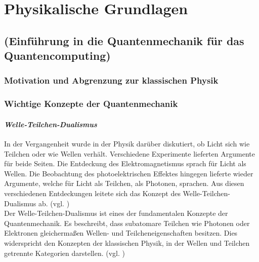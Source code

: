 \chapter{Physikalische Grundlagen}
\label{physics} %



\section{(Einführung in die Quantenmechanik für das Quantencomputing)}
\subsection{Motivation und Abgrenzung zur klassischen Physik }
\subsection{Wichtige Konzepte der Quantenmechanik }
\label{Wichtige Konzepte der Quantenmechanik}

\subsubsection*{\textit{Welle-Teilchen-Dualismus}}
\label{Welle-Teilchen-Dualismus}

In der Vergangenheit wurde in der Physik darüber diskutiert, ob Licht sich wie Teilchen oder wie Wellen verhält. Verschiedene Experimente lieferten Argumente für beide Seiten. Die Entdeckung des Elektromagnetismus sprach für Licht als Wellen. Die Beobachtung des photoelektrischen Effektes hingegen lieferte wieder Argumente, welche für Licht als Teilchen, als Photonen, sprachen. Aus diesen verschiedenen Entdeckungen leitete sich das Konzept des Welle-Teilchen-Dualismus ab. (vgl. \cite[Ch. 1.3.2]{kasirajan_fundamentals_2021})\\

Der Welle-Teilchen-Dualismus ist eines der fundamentalen Konzepte der Quantenmechanik. Es beschreibt, dass subatomare Teilchen wie Photonen oder Elektronen gleichermaßen Wellen- und Teilcheneigenschaften besitzen. Dies widerspricht den Konzepten der klassischen Physik, in der Wellen und Teilchen getrennte Kategorien darstellen. (vgl. \cite[Ch. 2]{schmitz_particles_2022})\\

